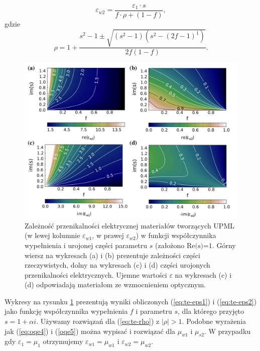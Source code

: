 \begin{equation}
	\varepsilon_{w2}=\frac{\varepsilon_1 \cdot s}{f\cdot \rho + (1-f)},
	\label{eq:te-eps2}
\end{equation}
gdzie
\begin{equation}
	\rho = 1+\frac{s^2-1 \pm \sqrt{(s^2-1)(s^2-(2f-1)^1)}}{2f(1-f)}.
	\label{eq:te-rho}
\end{equation}

\begin{figure}[tb]
	\includegraphics[width=\textwidth]{images/pml/oqe_materials.png}
	\caption{Zależność przenikalności elektrycznej materiałów tworzących UPML (w lewej kolumnie $\varepsilon_{w1}$, w prawej $\varepsilon_{w2}$) w funkcji współczynnika wypełnienia i urojonej części parametru $s$ (założono $\textrm{Re(s)=1}$. Górny wiersz na wykresach (a) i (b) prezentuje zależności części rzeczywistych, dolny na wykresach (c) i (d) części urojonych przenikalności elektrycznych. Ujemne wartości $\varepsilon$ na wykresach (c) i (d) odpowiadają materiałom ze wzmocnieniem optycznym. }
	\label{fig:upml-eps-s-f}
\end{figure}

Wykresy na rysunku \ref{fig:upml-eps-s-f} prezentują wyniki obliczonych (\ref{eq:te-eps1}) i (\ref{eq:te-eps2}) jako funkcję współczynnika wypełnienia $f$ i parametru $s$, dla którego przyjęto $s=1+\alpha i$. Używamy rozwiązań dla (\ref{eq:te-rho}) z $|\rho|>1$. Podobne wyrażenia jak (\ref{eq:oqe4}) i (\ref{oqe5}) można wypisać i rozwiązać dla $\mu_{w1}$ i $\mu_{s2}$. W przypadku gdy $\varepsilon_1=\mu_1$ otrzymujemy $\varepsilon_{w1}=\mu_{w1}$ i $\varepsilon_{w2}=\mu_{w2}$. 

